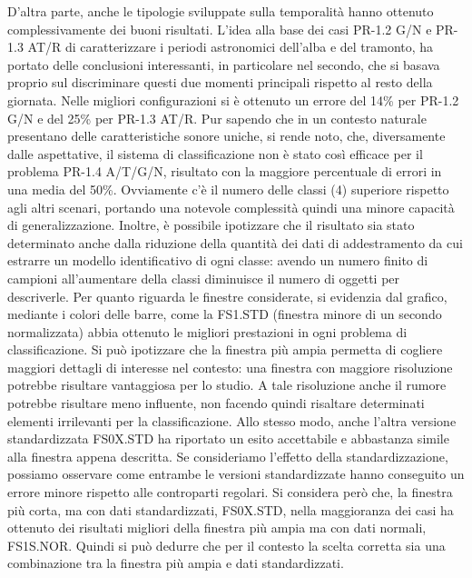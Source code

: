 D’altra parte, anche le tipologie sviluppate sulla temporalità hanno ottenuto complessivamente 
dei buoni risultati. L’idea alla base dei casi PR-1.2 G/N e PR-1.3 AT/R di
caratterizzare i periodi astronomici dell’alba e del tramonto, ha portato delle conclusioni
interessanti, in particolare nel secondo, che si basava proprio sul discriminare questi due
momenti principali rispetto al resto della giornata. Nelle migliori configurazioni si è ottenuto
un errore del 14\% per PR-1.2 G/N e del 25\% per PR-1.3 AT/R. Pur sapendo che in un
contesto naturale presentano delle caratteristiche sonore uniche, si rende noto, che,
diversamente dalle aspettative, il sistema di classificazione non è stato così efficace per il
problema PR-1.4 A/T/G/N, risultato con la maggiore percentuale di errori in una media del
50\%. Ovviamente c’è il numero delle classi (4) superiore rispetto agli altri scenari, portando
una notevole complessità quindi una minore capacità di generalizzazione. Inoltre, è possibile
ipotizzare che il risultato sia stato determinato anche dalla riduzione della quantità dei dati di
addestramento da cui estrarre un modello identificativo di ogni classe: avendo un numero
finito di campioni all’aumentare della classi diminuisce il numero di oggetti per descriverle.
Per quanto riguarda le finestre considerate, si evidenzia dal grafico, mediante i colori delle
barre, come la FS1.STD (finestra minore di un secondo normalizzata) abbia ottenuto le
migliori prestazioni in ogni problema di classificazione. Si può ipotizzare che la finestra più
ampia permetta di cogliere maggiori dettagli di interesse nel contesto: una finestra con
maggiore risoluzione potrebbe risultare vantaggiosa per lo studio. A tale risoluzione anche il
rumore potrebbe risultare meno influente, non facendo quindi risaltare determinati elementi
irrilevanti per la classificazione. Allo stesso modo, anche l’altra versione standardizzata
FS0X.STD ha riportato un esito accettabile e abbastanza simile alla finestra appena descritta.
Se consideriamo l’effetto della standardizzazione, possiamo osservare come entrambe le
versioni standardizzate hanno conseguito un errore minore rispetto alle controparti regolari.
Si considera però che, la finestra più corta, ma con dati standardizzati, FS0X.STD, nella
maggioranza dei casi ha ottenuto dei risultati migliori della finestra più ampia ma con dati
normali, FS1S.NOR. Quindi si può dedurre che per il contesto la scelta corretta sia una
combinazione tra la finestra più ampia e dati standardizzati.


